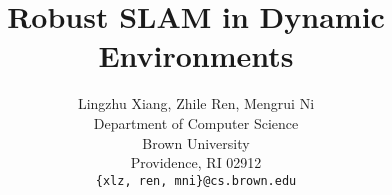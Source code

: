 \documentclass{article} %
\title{Robust SLAM in Dynamic Environments}
\author{
Lingzhu Xiang, Zhile Ren, Mengrui Ni \\
Department of Computer Science\\
Brown University\\
Providence, RI 02912 \\
\texttt{\{xlz, ren, mni\}@cs.brown.edu} \\
}
\begin{document}
\maketitle












{}
\end{document}
